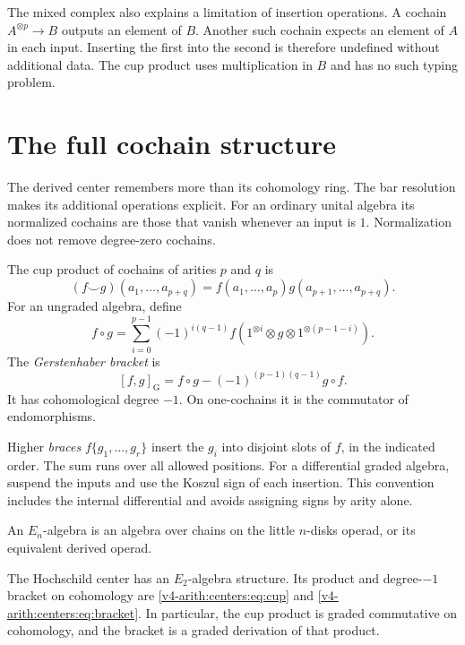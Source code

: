The mixed complex also explains a limitation of insertion
operations. A cochain $A^{\otimes p}\to B$ outputs an element
of $B$. Another such cochain expects an element of $A$ in
each input. Inserting the first into the second is therefore
undefined without additional data. The cup product uses
multiplication in $B$ and has no such typing problem.

\section{The full cochain structure}
\label{v4-arith:centers:sec:cochains}

The derived center remembers more than its cohomology ring.
The bar resolution makes its additional operations explicit.
For an ordinary unital algebra its normalized cochains are
those that vanish whenever an input is $1$. Normalization
does not remove degree-zero cochains.

The cup product of cochains of arities $p$ and $q$ is
\begin{equation}\label{v4-arith:centers:eq:cup}
 (f\smile g)(a_1,\ldots,a_{p+q})
 =f(a_1,\ldots,a_p)g(a_{p+1},\ldots,a_{p+q}).
\end{equation}
For an ungraded algebra, define
\[
 f\circ g=\sum_{i=0}^{p-1}(-1)^{i(q-1)}
 f(1^{\otimes i}\otimes g\otimes1^{\otimes(p-1-i)}).
\]
The \emph{Gerstenhaber bracket} is
\begin{equation}\label{v4-arith:centers:eq:bracket}
 [f,g]_{\mathrm G}
 =f\circ g-(-1)^{(p-1)(q-1)}g\circ f.
\end{equation}
It has cohomological degree $-1$. On one-cochains it is
the commutator of endomorphisms.

Higher \emph{braces} $f\{g_1,\ldots,g_r\}$ insert the
$g_i$ into disjoint slots of $f$, in the indicated order.
The sum runs over all allowed positions. For a differential
graded algebra, suspend the inputs and use the Koszul sign
of each insertion. This convention includes the internal
differential and avoids assigning signs by arity alone.

An $E_n$-algebra is an algebra over chains on the little
$n$-disks operad, or its equivalent derived operad.

\begin{theorem}
\label{v4-arith:centers:thm:deligne}
The Hochschild center has an $E_2$-algebra structure.
Its product and degree-$-1$ bracket on cohomology are
\eqref{v4-arith:centers:eq:cup} and
\eqref{v4-arith:centers:eq:bracket}. In particular, the cup
product is graded commutative on cohomology, and the bracket
is a graded derivation of that product.
\end{theorem}

